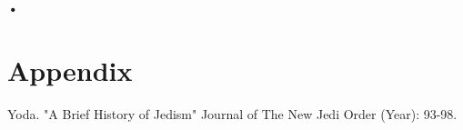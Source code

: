 \documentclass[a4paper]{report}
\begin{document}

\tableofcontents
 
\newpage

\listoffigures
{} 


\listoftables 
{} 
\newpage



\newpage

\clearpage







\textbf{•}
\clearpage
\section*{Appendix}


\begin{thebibliography}{}
 Yoda. "A Brief History of Jedism" Journal of The New Jedi Order (Year): 93-98.
 \end{thebibliography} 
\end{document}
